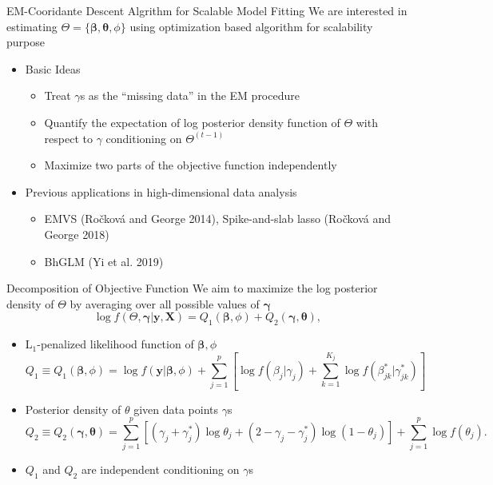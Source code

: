 \documentclass[
  ignorenonframetext,
  aspectratio=169]{beamer}
\providecommand{\tightlist}{%
  \setlength{\itemsep}{0pt}\setlength{\parskip}{0pt}}
\newcommand{\bs}[1]{\boldsymbol{#1}}
\newcommand{\tp}{*}
\begin{document}
\begin{frame}{EM-Cooridante Descent Algrithm for Scalable Model Fitting}
\protect\hypertarget{em-cooridante-descent-algrithm-for-scalable-model-fitting}{}
We are interested in estimating
\(\Theta = \{\bm \beta, \bm \theta, \phi\}\) using optimization based
algorithm for scalability purpose

\begin{itemize}
\tightlist
\item
  Basic Ideas

  \begin{itemize}
  \tightlist
  \item
    Treat \(\gamma\)s as the ``missing data'' in the EM procedure
  \item
    Quantify the expectation of log posterior density function of
    \(\Theta\) with respect to \(\gamma\) conditioning on
    \(\Theta^{(t-1)}\)
  \item
    Maximize two parts of the objective function independently
  \end{itemize}
\item
  Previous applications in high-dimensional data analysis

  \begin{itemize}
  \tightlist
  \item
    EMVS (Ročková and George 2014), Spike-and-slab lasso (Ročková and
    George 2018)
  \item
    BhGLM (Yi et al. 2019)
  \end{itemize}
\end{itemize}
\end{frame}

\begin{frame}{Decomposition of Objective Function}
\protect\hypertarget{decomposition-of-objective-function}{}
We aim to maximize the log posterior density of \(\Theta\) by averaging
over all possible values of \(\bm \gamma\)
\[ \log f(\Theta, \bs \gamma| \textbf{y}, \textbf{X}) = Q_1(\bs \beta, \phi) + Q_2 (\bs \gamma,\bs \theta),\]

\begin{itemize}
\item
  L\(_1\)-penalized likelihood function of \(\bs \beta, \phi\)
  \[Q_1 \equiv Q_1(\bs \beta, \phi) = \log f(\textbf{y}|\bs \beta, \phi) + \sum\limits_{j=1}^p\left[\log f(\beta_j|\gamma_j)+\sum\limits_{k=1}^{K_j} \log f(\beta^{\tp}_{jk}|\gamma^{\tp}_{jk})\right]\]
\item
  Posterior density of \(\theta\) given data points \(\gamma\)s
  \[Q_2 \equiv Q_2(\bs\gamma,\bs\theta) = \sum\limits_{j=1}^{p} \left[ (\gamma_j+\gamma_{j}^{\tp})\log \theta_j + (2-\gamma_j-\gamma_{j}^{\tp}) \log (1-\theta_j)\right] +  \sum\limits_{j=1}^{p}\log f(\theta_j).\]
\item
  \(Q_1\) and \(Q_2\) are independent conditioning on \(\gamma\)s
\end{itemize}
\end{frame}
\end{document}
